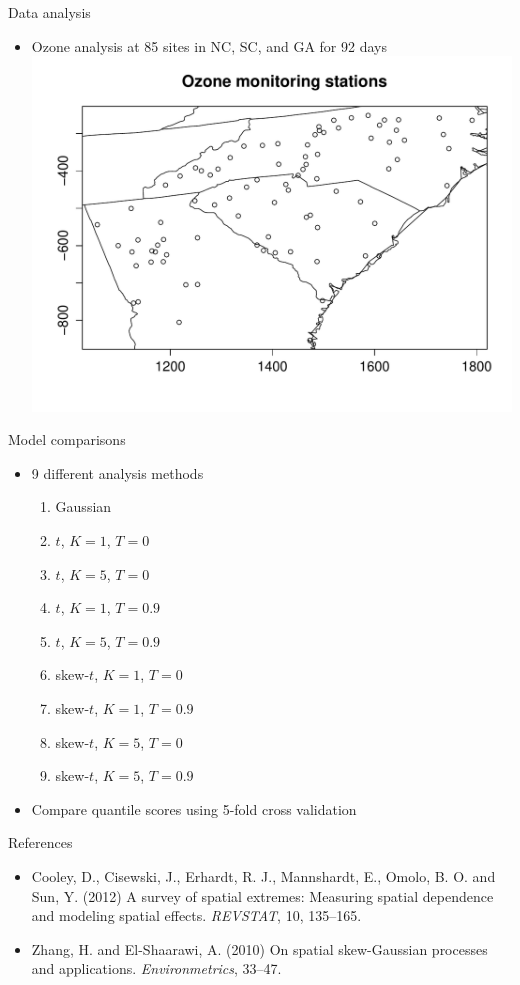 \documentclass{beamer}
\begin{document}
\begin{frame}{Data analysis}
  \begin{itemize} \setlength{\itemsep}{0.5em}
    \item Ozone analysis at 85 sites in NC, SC, and GA for 92 days
    \includegraphics[width=1\linewidth]{./plots/ozone_station.pdf}
  \end{itemize}
\end{frame}

\begin{frame}{Model comparisons}
  \begin{itemize} \setlength{\itemsep}{0.5em}
    \item 9 different analysis methods
    \begin{enumerate}[1.]
      \item Gaussian
      \item $t$, $K=1$, $T=0$
      \item $t$, $K=5$, $T=0$
      \item $t$, $K=1$, $T=0.9$
      \item $t$, $K=5$, $T=0.9$
      \item skew-$t$, $K=1$, $T=0$
      \item skew-$t$, $K=1$, $T=0.9$
      \item skew-$t$, $K=5$, $T=0$
      \item skew-$t$, $K=5$, $T=0.9$
    \end{enumerate}
    \item Compare quantile scores using 5-fold cross validation
  \end{itemize}
\end{frame}


\begin{frame}{References}
  \begin{itemize} \setlength{\itemsep}{0.5em}
    \item Cooley, D., Cisewski, J., Erhardt, R. J., Mannshardt, E., Omolo, B. O. and Sun, Y. (2012) A survey of spatial extremes: Measuring spatial dependence and modeling spatial effects. {\it REVSTAT}, 10, 135--165.
    \item Zhang, H. and El-Shaarawi, A. (2010) On spatial skew-Gaussian processes and applications. {\it Environmetrics}, 33--47.
  \end{itemize}
\end{frame}
\end{document}
